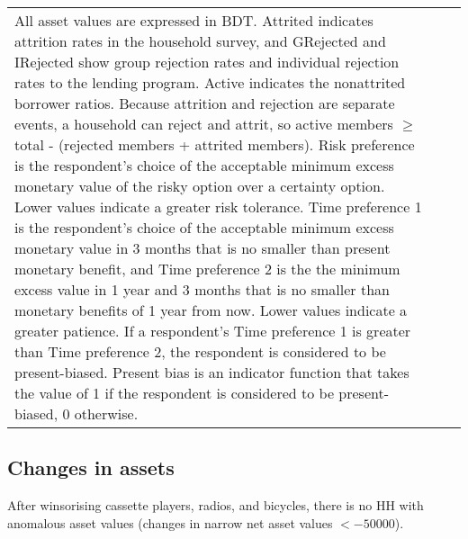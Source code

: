 \begin{minipage}[t]{14cm}
\begin{tabular}{>{\hfill\scriptsize}p{1cm}<{}>{\hfill\scriptsize}p{.25cm}<{}>{\scriptsize}p{12cm}<{\hfill}}
All asset values are expressed in BDT. \textsf{Attrited} indicates attrition rates in the household survey, and \textsf{GRejected} and \textsf{IRejected} show group rejection rates and individual rejection rates to the lending program. \textsf{Active} indicates the nonattrited borrower ratios. Because attrition and rejection are separate events, a household can reject and attrit, so active members $\geqslant$ total - (rejected members + attrited members). \textsf{Risk preference} is the respondent's choice of the acceptable minimum excess monetary value of the risky option over a certainty option. Lower values indicate a greater risk tolerance. \textsf{Time preference 1} is the respondent's choice of the acceptable minimum excess monetary value in 3 months that is no smaller than present monetary benefit, and \textsf{Time preference 2} is the the minimum excess value in 1 year and 3 months that is no smaller than monetary benefits of 1 year from now. Lower values indicate a greater patience. If a respondent's \textsf{Time preference 1} is greater than \textsf{Time preference 2}, the respondent is considered to be present-biased. \textsf{Present bias} is an indicator function that takes the value of 1 if the respondent is considered to be present-biased, 0 otherwise.
\end{tabular}
\end{minipage}



\subsection{Changes in assets}


After winsorising cassette players, radios, and bicycles, there is no HH with anomalous asset values (changes in narrow net asset values $<-50000$).




